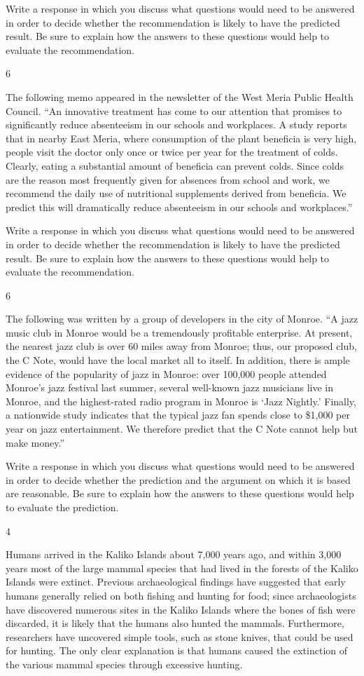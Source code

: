 \documentclass[]{article}
\begin{document}
Write a response in which you discuss what questions would need to be
answered in order to decide whether the recommendation is likely to have
the predicted result. Be sure to explain how the answers to these
questions would help to evaluate the recommendation.

6

The following memo appeared in the newsletter of the West Meria Public
Health Council. ``An innovative treatment has come to our attention that
promises to significantly reduce absenteeism in our schools and
workplaces. A study reports that in nearby East Meria, where consumption
of the plant beneficia is very high, people visit the doctor only once
or twice per year for the treatment of colds. Clearly, eating a
substantial amount of beneficia can prevent colds. Since colds are the
reason most frequently given for absences from school and work, we
recommend the daily use of nutritional supplements derived from
beneficia. We predict this will dramatically reduce absenteeism in our
schools and workplaces.''

Write a response in which you discuss what questions would need to be
answered in order to decide whether the recommendation is likely to have
the predicted result. Be sure to explain how the answers to these
questions would help to evaluate the recommendation.

6

The following was written by a group of developers in the city of
Monroe. ``A jazz music club in Monroe would be a tremendously profitable
enterprise. At present, the nearest jazz club is over 60 miles away from
Monroe; thus, our proposed club, the C Note, would have the local market
all to itself. In addition, there is ample evidence of the popularity of
jazz in Monroe: over 100,000 people attended Monroe's jazz festival last
summer, several well-known jazz musicians live in Monroe, and the
highest-rated radio program in Monroe is `Jazz Nightly.' Finally, a
nationwide study indicates that the typical jazz fan spends close to
\$1,000 per year on jazz entertainment. We therefore predict that the C
Note cannot help but make money.''

Write a response in which you discuss what questions would need to be
answered in order to decide whether the prediction and the argument on
which it is based are reasonable. Be sure to explain how the answers to
these questions would help to evaluate the prediction.

4

Humans arrived in the Kaliko Islands about 7,000 years ago, and within
3,000 years most of the large mammal species that had lived in the
forests of the Kaliko Islands were extinct. Previous archaeological
findings have suggested that early humans generally relied on both
fishing and hunting for food; since archaeologists have discovered
numerous sites in the Kaliko Islands where the bones of fish were
discarded, it is likely that the humans also hunted the mammals.
Furthermore, researchers have uncovered simple tools, such as stone
knives, that could be used for hunting. The only clear explanation is
that humans caused the extinction of the various mammal species through
excessive hunting.
\end{document}
